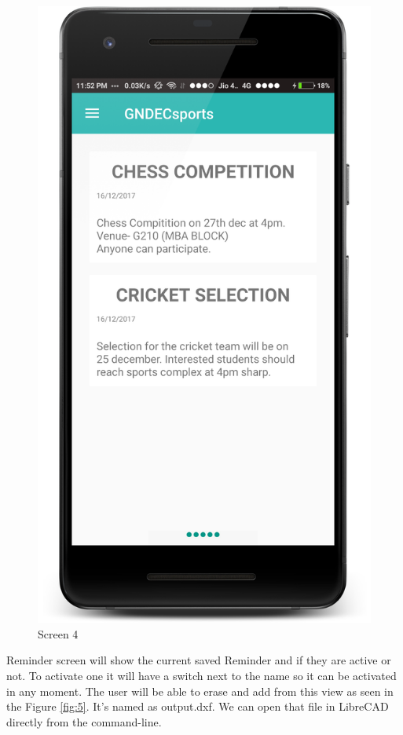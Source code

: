 \begin{figure}[ht]
\centering
\includegraphics[scale=0.38]{images/s4.png}
\caption{Screen 4}
\label{fig:4}
\end{figure}

\noindent Reminder screen will show the current saved Reminder and if they are active or not.
To activate one it will have a switch next to the name so it can be activated in any
moment. The user will be able to erase and add from this view as seen in the Figure \ref{fig:5}. It's named as output.dxf. We can open that file in LibreCAD directly from the command-line.\\


